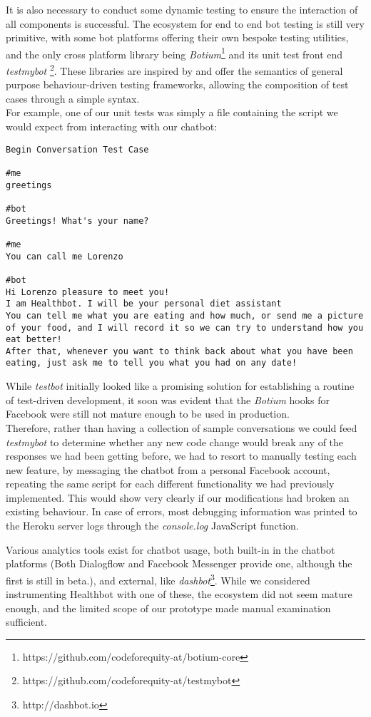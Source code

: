 It is also necessary to conduct some dynamic testing to ensure the interaction of all components is successful. The ecosystem for end to end bot testing is still very primitive, with some bot platforms offering their own bespoke testing utilities, and the only cross platform library being \textit{Botium}\footnote{https://github.com/codeforequity-at/botium-core} and its unit test front end \textit{testmybot} \footnote{https://github.com/codeforequity-at/testmybot}. These libraries are inspired by and offer the semantics of general purpose behaviour-driven testing frameworks, allowing the composition of test cases through a simple syntax. \\
For example, one of our unit tests was simply a file containing the script we would expect from interacting with our chatbot:
\begin{lstlisting}
Begin Conversation Test Case

#me
greetings

#bot
Greetings! What's your name?

#me
You can call me Lorenzo

#bot
Hi Lorenzo pleasure to meet you!
I am Healthbot. I will be your personal diet assistant
You can tell me what you are eating and how much, or send me a picture of your food, and I will record it so we can try to understand how you eat better!
After that, whenever you want to think back about what you have been eating, just ask me to tell you what you had on any date!
\end{lstlisting}
While \textit{testbot} initially looked like a promising solution for establishing a routine of test-driven development, it soon was evident that the \textit{Botium} hooks for Facebook were still not mature enough to be used in production. \\
Therefore, rather than having a collection of sample conversations we could feed \textit{testmybot} to determine whether any new code change would break any of the responses we had been getting before, we had to resort to manually testing each new feature, by messaging the chatbot from a personal Facebook account, repeating the same script for each different functionality we had previously implemented. This would show very clearly if our modifications had broken an existing behaviour. In case of errors, most debugging information was printed to the Heroku server logs through the \textit{console.log} JavaScript function.

Various analytics tools exist for chatbot usage, both built-in in the chatbot platforms (Both Dialogflow and Facebook Messenger provide one, although the first is still in beta.), and external, like \textit{dashbot}\footnote{http://dashbot.io}. While we considered instrumenting Healthbot with one of these, the ecosystem did not seem mature enough, and the limited scope of our prototype made manual examination sufficient.

